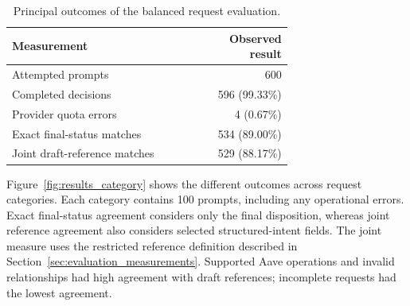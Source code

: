 \begin{table}[H]
    \centering\small
    \caption{Principal outcomes of the balanced request evaluation.}
    \label{tab:results_balanced_summary}
    \begin{tabular}{p{0.70\linewidth}r}
    \hline
    \textbf{Measurement} & \textbf{Observed result} \\
    \hline
    Attempted prompts & 600 \\
    Completed decisions & 596 (99.33\%) \\
    Provider quota errors & 4 (0.67\%) \\
    Exact final-status matches & 534 (89.00\%) \\
    Joint draft-reference matches & 529 (88.17\%) \\
    \hline
    \end{tabular}
\end{table}

Figure~\ref{fig:results_category} shows the different outcomes across
request categories. Each category contains 100
prompts, including any operational errors. Exact final-status agreement considers only
the final disposition, whereas joint reference agreement
also considers selected structured-intent fields. The joint measure uses the
restricted reference definition described in Section~\ref{sec:evaluation_measurements}. Supported Aave operations and invalid relationships
had high agreement with draft references; incomplete requests had the
lowest agreement.


